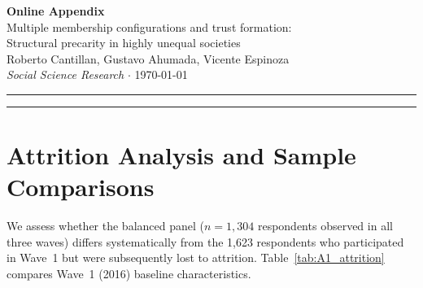 \documentclass[12pt, a4paper]{article}
\begin{document}

\begin{center}
  {\Large \textbf{Online Appendix}}\\[8pt]
  {\large Multiple membership configurations and trust formation:\\
  Structural precarity in highly unequal societies}\\[6pt]
  {\normalsize Roberto Cantillan, Gustavo Ahumada, Vicente Espinoza}\\[4pt]
  {\small \textit{Social Science Research} $\cdot$ \today}
\end{center}

\noindent\rule{\textwidth}{0.4pt}

\tableofcontents
\bigskip
\noindent\rule{\textwidth}{0.4pt}

\section{Attrition Analysis and Sample Comparisons}
\label{sec:attrition}

We assess whether the balanced panel ($n = 1{,}304$ respondents observed in
all three waves) differs systematically from the 1{,}623 respondents who
participated in Wave~1 but were subsequently lost to attrition.
Table~\ref{tab:A1_attrition} compares Wave~1 (2016) baseline characteristics.
\end{document}
